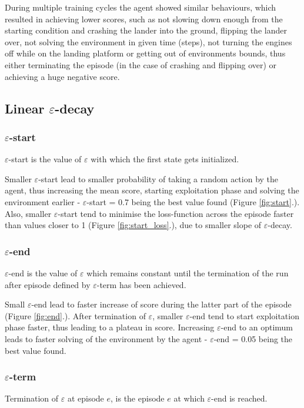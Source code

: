 \documentclass{article}
\begin{document}
During multiple training cycles the agent showed similar behaviours, which resulted in achieving lower scores, such as not slowing down enough from the starting condition and crashing the lander into the ground, flipping the lander over, not solving the environment in given time (steps), not turning the engines off while on the landing platform or getting out of environments bounds, thus either terminating the episode (in the case of crashing and flipping over) or achieving a huge negative score.

\subsection*{Linear $\varepsilon$-decay}

\subsubsection*{$\varepsilon$-start}
$\varepsilon$-start is the value of $\varepsilon$ with which the first state gets initialized.

Smaller $\varepsilon$-start lead to smaller probability of taking a random action by the agent, thus increasing the mean score, starting exploitation phase and solving the environment earlier - $\varepsilon$-start = 0.7 being the best value found (Figure \ref{fig:start}.). Also, smaller $\varepsilon$-start tend to minimise the loss-function across the episode faster than values closer to 1 (Figure \ref{fig:start_loss}.), due to smaller slope of $\varepsilon$-decay.

\subsubsection*{$\varepsilon$-end}
$\varepsilon$-end is the value of $\varepsilon$ which remains constant  until the termination of the run after episode defined by $\varepsilon$-term has been achieved.

Small $\varepsilon$-end lead to faster increase of score during the latter part of the episode (Figure \ref{fig:end}.). After termination of $\varepsilon$, smaller $\varepsilon$-end tend to start exploitation phase faster, thus leading to a plateau in score. Increasing $\varepsilon$-end to an optimum leads to faster solving of the environment by the agent - $\varepsilon$-end = 0.05 being the best value found.

\subsubsection*{$\varepsilon$-term}
Termination of $\varepsilon$ at episode $e$, is the episode $e$ at which $\varepsilon$-end is reached.
\end{document}
